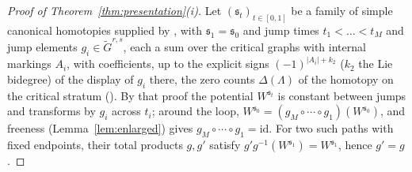 \documentclass[11pt]{amsart}
\theoremstyle{definition}
\theoremstyle{remark}
\begin{document}
\begin{proof}[Proof of Theorem~\ref{thm:presentation}(i)]
Let $(\mathfrak s_{t})_{t\in[0,1]}$ be a family of simple canonical homotopies
supplied by \cite[Lem.~3.40]{GKT}, with $\mathfrak s_{1}=\mathfrak s_{0}$ and jump times
$t_{1}<\dots<t_{M}$ and jump elements $g_{i}\in\widetilde G^{r,s}$, each a sum over
the critical graphs with internal markings $A_{i}$, with coefficients, up to the
explicit signs $(-1)^{|A_{i}|+k_{2}}$ ($k_{2}$ the Lie bidegree) of the display
of $g_{i}$ there, the zero
counts $\Delta(\Lambda)$ of the homotopy on the critical stratum
(\cite[proof of Thm.~5.9, eqns.~(5.33)--(5.37)]{GKT}). By that proof the potential
$W^{\mathfrak s_{t}}$ is constant between jumps and transforms by $g_{i}$ across $t_{i}$;
around the loop, $W^{\mathfrak s_{0}}=(g_{M}\circ\cdots\circ g_{1})(W^{\mathfrak s_{0}})$, and
freeness (Lemma~\ref{lem:enlarged}) gives $g_{M}\circ\cdots\circ
g_{1}=\mathrm{id}$. For two such paths with fixed endpoints, their total products
$g,g'$ satisfy $g'g^{-1}(W^{\mathfrak s_{1}})=W^{\mathfrak s_{1}}$, hence $g'=g$.
\end{proof}
\end{document}
